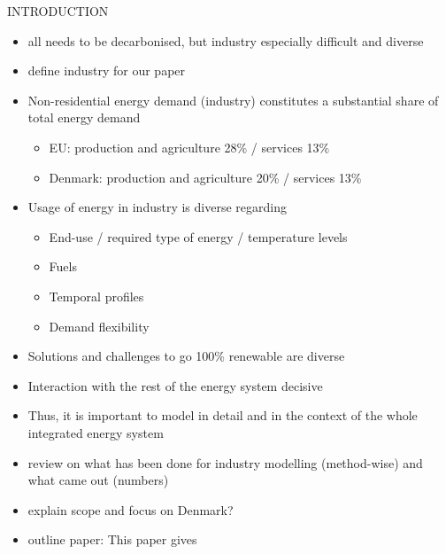 \documentclass[review]{elsarticle}
\begin{document}
INTRODUCTION
\begin{itemize}
    \item all needs to be decarbonised, but industry especially difficult and diverse
    \item define industry for our paper
    \item Non-residential energy demand (industry) constitutes a
substantial share of total energy demand
    \begin{itemize}
        \item EU: production and agriculture 28\% / services 13\% \cite{Eurostat2017}
        \item Denmark: production and agriculture 20\% / services 13\% \cite{DanishEnergyAgency2014}
    \end{itemize}
    \item Usage of energy in industry is diverse regarding
        \begin{itemize}
            \item End-use / required type of energy / temperature levels
            \item Fuels
            \item Temporal profiles
            \item Demand flexibility
        \end{itemize}
    \item Solutions and challenges to go 100\% renewable are diverse
    \item Interaction with the rest of the energy system decisive
    \item Thus, it is important to model in detail and in the context of the whole integrated energy system
    \item review on what has been done for industry modelling (method-wise) and what came out (numbers)
    \item explain scope and focus on Denmark?
    \item outline paper: This paper gives 
\end{itemize}
\end{document}
